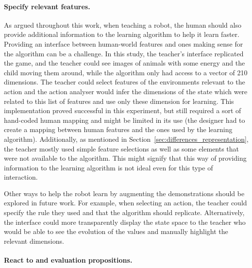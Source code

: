 \paragraph{Specify relevant features.} %

As argued throughout this work, when teaching a robot, the human should also provide additional information to the learning algorithm to help it learn faster. Providing an interface between human-world features and ones making sense for the algorithm can be a challenge. 
In this study, the teacher's interface replicated the game, and the teacher could see images of animals with some energy and the child moving them around, while the algorithm only had access to a vector of 210 dimensions. The teacher could select features of the environments relevant to the action and the action analyser would infer the dimensions of the state which were related to this list of features and use only these dimension for learning. This implementation proved successful in this experiment, but still required a sort of hand-coded human mapping and might be limited in its use (the designer had to create a mapping between human features and the ones used by the learning algorithm). Additionally, as mentioned in Section~\ref{sec:differences_representation}, the teacher mostly used simple feature selections as well as some elements that were not available to the algorithm. This might signify that this way of providing information to the learning algorithm is not ideal even for this type of interaction.

Other ways to help the robot learn by augmenting the demonstrations should be explored in future work. For example, when selecting an action, the teacher could specify the rule they used and that the algorithm should replicate. Alternatively, the interface could more transparently display the state space to the teacher who would be able to see the evolution of the values and manually highlight the relevant dimensions.

\paragraph{React to and evaluation propositions.} %

